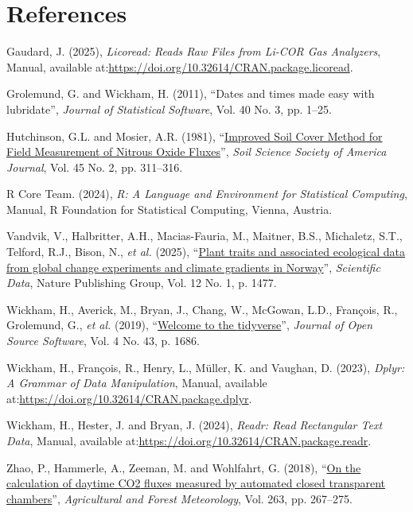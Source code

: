\documentclass[
  letterpaper,
  DIV=11,
  numbers=noendperiod]{scrartcl}
\newlength{\cslhangindent}
\newenvironment{CSLReferences}[2] %
 {\begin{list}{}{%
  \setlength{\itemindent}{0pt}
  \setlength{\leftmargin}{0pt}
  \setlength{\parsep}{0pt}
  \ifodd #1
   \setlength{\leftmargin}{\cslhangindent}
   \setlength{\itemindent}{-1\cslhangindent}
  \fi
  \setlength{\itemsep}{#2\baselineskip}}}
 {\end{list}}
\begin{document}
\section*{References}\label{references}

\label{refs}
\begin{CSLReferences}{1}{0}
Gaudard, J. (2025), \emph{Licoread: {Reads} Raw Files from Li-{COR} Gas
Analyzers}, Manual, available
at:\url{https://doi.org/10.32614/CRAN.package.licoread}.

Grolemund, G. and Wickham, H. (2011), {``Dates and times made easy with
{lubridate}''}, \emph{Journal of Statistical Software}, Vol. 40 No. 3,
pp. 1--25.

Hutchinson, G.L. and Mosier, A.R. (1981),
{``\href{https://doi.org/10.2136/sssaj1981.03615995004500020017x}{Improved
{Soil Cover Method} for {Field Measurement} of {Nitrous Oxide
Fluxes}}''}, \emph{Soil Science Society of America Journal}, Vol. 45 No.
2, pp. 311--316.

R Core Team. (2024), \emph{R: A Language and Environment for Statistical
Computing}, Manual, R Foundation for Statistical Computing, Vienna,
Austria.

Vandvik, V., Halbritter, A.H., Macias-Fauria, M., Maitner, B.S.,
Michaletz, S.T., Telford, R.J., Bison, N., \emph{et al.} (2025),
{``\href{https://doi.org/10.1038/s41597-025-05509-4}{Plant traits and
associated ecological data from global change experiments and climate
gradients in {Norway}}''}, \emph{Scientific Data}, Nature Publishing
Group, Vol. 12 No. 1, p. 1477.

Wickham, H., Averick, M., Bryan, J., Chang, W., McGowan, L.D., François,
R., Grolemund, G., \emph{et al.} (2019),
{``\href{https://doi.org/10.21105/joss.01686}{Welcome to the
{tidyverse}}''}, \emph{Journal of Open Source Software}, Vol. 4 No. 43,
p. 1686.

Wickham, H., François, R., Henry, L., Müller, K. and Vaughan, D. (2023),
\emph{Dplyr: A Grammar of Data Manipulation}, Manual, available
at:\url{https://doi.org/10.32614/CRAN.package.dplyr}.

Wickham, H., Hester, J. and Bryan, J. (2024), \emph{Readr: {Read}
Rectangular Text Data}, Manual, available
at:\url{https://doi.org/10.32614/CRAN.package.readr}.

Zhao, P., Hammerle, A., Zeeman, M. and Wohlfahrt, G. (2018),
{``\href{https://doi.org/10.1016/j.agrformet.2018.08.022}{On the
calculation of daytime {CO2} fluxes measured by automated closed
transparent chambers}''}, \emph{Agricultural and Forest Meteorology},
Vol. 263, pp. 267--275.

\end{CSLReferences}
\end{document}
